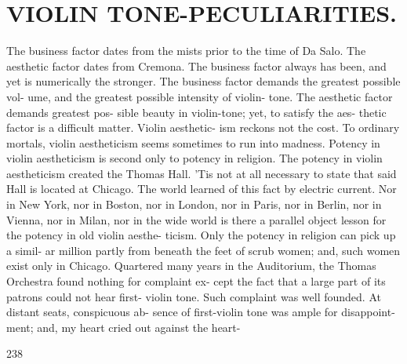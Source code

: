 \documentclass{article}
\begin{document}
\section*{VIOLIN TONE-PECULIARITIES.}
The business factor dates from the mists prior to the time of Da Salo. The aesthetic factor dates from Cremona. The business factor always has been, and yet is numerically the stronger. The business factor demands the greatest possible vol- ume, and the greatest possible intensity of violin- tone. The aesthetic factor demands greatest pos- sible beauty in violin-tone; yet, to satisfy the aes- thetic factor is a difficult matter. Violin aesthetic- ism reckons not the cost. To ordinary mortals, violin aestheticism seems sometimes to run into madness. Potency in violin aestheticism is second only to potency in religion. The potency in violin aestheticism created the Thomas Hall. 'Tis not at all necessary to state that said Hall is located at Chicago. The world learned of this fact by electric current. Nor in New York, nor in Boston, nor in London, nor in Paris, nor in Berlin, nor in Vienna, nor in Milan, nor in the wide world is there a parallel object lesson for the potency in old violin aesthe- ticism. Only the potency in religion can pick up a simil- ar million partly from beneath the feet of scrub women; and, such women exist only in Chicago. Quartered many years in the Auditorium, the Thomas Orchestra found nothing for complaint ex- cept the fact that a large part of its patrons could not hear first- violin tone. Such complaint was well founded. At distant seats, conspicuous ab- sence of first-violin tone was ample for disappoint- ment; and, my heart cried out against the heart-

238
\end{document}
